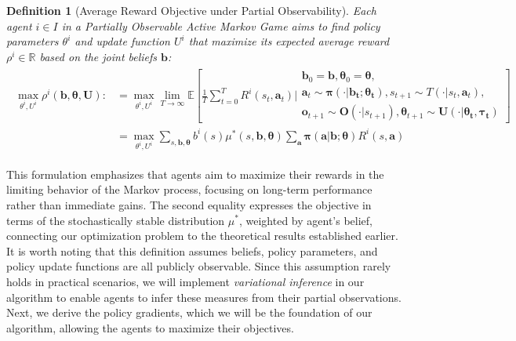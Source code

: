 \documentclass[a4paper,12pt]{report}
\newtheorem{definition}{Definition}
\begin{document}
\begin{definition}[Average Reward Objective under Partial Observability]
    Each agent $i \in I$ in a Partially Observable Active Markov Game aims to find policy parameters $\theta^i$ and update function $U^i$ that maximize its expected average reward $\rho^i \in \mathbb{R}$ based on the joint beliefs $\boldsymbol{b}$:
    \begin{align}
        \begin{split}
            \max_{\theta^i, U^i} \rho^i(\boldsymbol{b}, \boldsymbol{\theta}, \boldsymbol{U}) : & = \max_{\theta^i, U^i} \lim_{T \to \infty} \mathbb{E}\left[\frac{1}{T}\sum_{t=0}^T R^i(s_t, \boldsymbol{a}_t) \Bigg|
                \begin{array}{c}
                    \boldsymbol{b}_0= \boldsymbol{b}, \boldsymbol{\theta}_0= \boldsymbol{\theta}, \\
                    \boldsymbol{a}_t \sim \boldsymbol{\pi}(\cdot|\boldsymbol{b_t}; \boldsymbol{\theta_t}),
                    s_{t+1} \sim T(\cdot|s_t, \boldsymbol{a}_t),                                  \\
                    \boldsymbol{o}_{t+1} \sim \boldsymbol{O}(\cdot|s_{t+1}),
                    \boldsymbol{\theta}_{t+1} \sim \boldsymbol{U}(\cdot|\boldsymbol{\theta_t}, \boldsymbol{\tau_t})
                \end{array}
            \right]                                                                                                                                                                                                                                                                                                                          \\
                                                                                               & = \max_{\theta^i, U^i} \sum_{s, \boldsymbol{b}, \boldsymbol{\theta}} b^i(s) \mu^*(s, \boldsymbol{b}, \boldsymbol{\theta}) \sum_{\boldsymbol{a}} \boldsymbol{\pi}(\boldsymbol{a}|\boldsymbol{b}; \boldsymbol{\theta}) R^i(s, \boldsymbol{a})
        \end{split}
    \end{align}


\end{definition}

This formulation emphasizes that agents aim to maximize their rewards in the limiting behavior of the Markov process, focusing on long-term performance rather than immediate gains. The second equality expresses the objective in terms of the stochastically stable distribution $\mu^*$, weighted by agent's belief, connecting our optimization problem to the theoretical results established earlier. It is worth noting that this definition assumes beliefs, policy parameters, and policy update functions are all publicly observable. Since this assumption rarely holds in practical scenarios, we will implement \textit{variational inference} in our algorithm to enable agents to infer these measures from their partial observations. Next, we derive the policy gradients, which we will be the foundation of our algorithm, allowing the agents to maximize their objectives.
\end{document}
